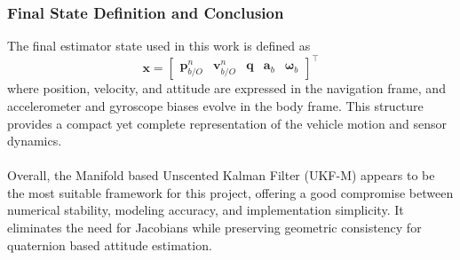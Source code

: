 \subsubsection{Final State Definition and Conclusion}
The final estimator state used in this work is defined as
$$
    \mathbf{x} =
    \begin{bmatrix}
        \mathbf{p}_{b/O}^{n} & \mathbf{v}_{b/O}^{n} & \mathbf{q} & \mathbf{a}_b & \mathbf{\omega}_b
    \end{bmatrix}^\top
$$
where position, velocity, and attitude are expressed in the navigation frame, and accelerometer and gyroscope biases evolve in the body frame. This structure provides a compact yet complete representation of the vehicle motion and sensor dynamics.  
\\ \\
Overall, the Manifold based Unscented Kalman Filter (UKF-M) appears to be the most suitable framework for this project, offering a good compromise between numerical stability, modeling accuracy, and implementation simplicity. It eliminates the need for Jacobians while preserving geometric consistency for quaternion based attitude estimation.
